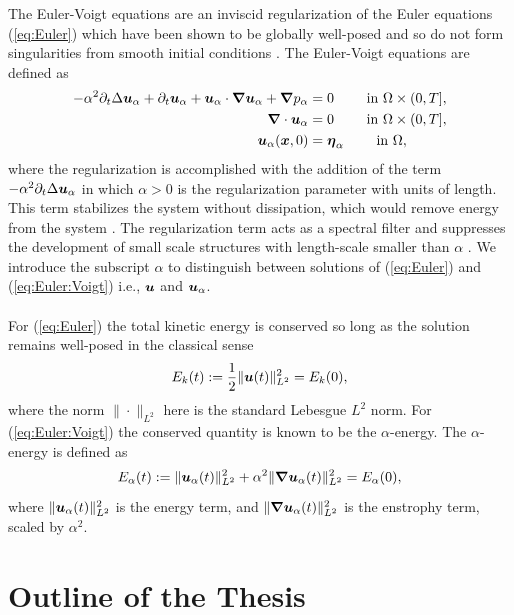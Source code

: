 The Euler-Voigt equations are an inviscid regularization of the Euler equations (\ref{eq:Euler}) which have been shown to be globally well-posed and so do not form singularities from smooth initial conditions \cite{cao_global_2006}. The Euler-Voigt equations are defined as
\begin{subequations}\label{eq:Euler:Voigt}
\begin{align}
-\alpha^2\partial_t\Delta\boldsymbol u_\alpha + \partial_t \boldsymbol u_\alpha + \boldsymbol u_\alpha\cdot {\boldsymbol \nabla}\boldsymbol u_\alpha + {\boldsymbol \nabla} p_{\alpha} &= 0 \qquad\text{ in } \Omega\times (0,T],\\ 
{\boldsymbol \nabla} \cdot \boldsymbol u_\alpha &= 0 \qquad\text{ in } \Omega\times (0,T],\\
\boldsymbol u_\alpha(\boldsymbol x,0) &= {\boldsymbol \eta_\alpha} \qquad\text{ in }\Omega,
\end{align}
\end{subequations}
\noindent where the regularization is accomplished with the addition of the term $-\alpha^2\partial_t \Delta \boldsymbol u_\alpha$ in which $\alpha >0$ is the regularization parameter with units of length. This term stabilizes the system without dissipation, which would remove energy from the system \cite{larios_computational_2018}. The regularization term acts as a spectral filter and suppresses the development of small scale structures with length-scale smaller than $\alpha$ \cite{molfetta_self-truncation_2015}. We introduce the subscript $\alpha$ to distinguish between solutions of (\ref{eq:Euler}) and (\ref{eq:Euler:Voigt}) i.e., $\boldsymbol u$ and $\boldsymbol u_\alpha$. 
\\~\\
For (\ref{eq:Euler}) the total kinetic energy is conserved so long as the solution remains well-posed in the classical sense
\begin{equation}\label{eq:total:kinetic:energy}
E_k(t) := \frac{1}{2}\|\boldsymbol u(t)\|_{L^2}^2 = E_k(0),
\end{equation} 
where the norm $\|\cdot\|_{L^2}$ here is the standard Lebesgue $L^2$ norm. For (\ref{eq:Euler:Voigt}) the conserved quantity is known to be the $\alpha$-energy. The $\alpha$-energy is defined as
\begin{equation}\label{eq:alpha:Energy}
E_\alpha(t):=\|\boldsymbol u_\alpha(t)\|_{L^2}^2 + \alpha^2\|{\boldsymbol \nabla}\boldsymbol u_\alpha(t)\|_{L^2}^2 = E_\alpha(0),
\end{equation}
where $\|\boldsymbol u_\alpha(t)\|_{L^2}^2$ is the energy term, and $\|{\boldsymbol \nabla}\boldsymbol u_\alpha(t)\|_{L^2}^2$ is the enstrophy term, scaled by $\alpha^2$.

\section{Outline of the Thesis}

